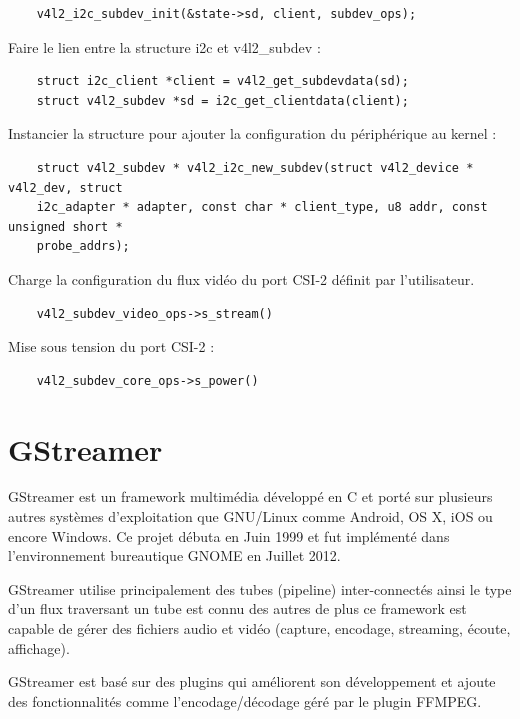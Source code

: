 \begin{lstlisting}
    v4l2_i2c_subdev_init(&state->sd, client, subdev_ops);
\end{lstlisting}

Faire le lien entre la structure i2c et v4l2\_subdev :

\begin{lstlisting}
    struct i2c_client *client = v4l2_get_subdevdata(sd);
    struct v4l2_subdev *sd = i2c_get_clientdata(client);
\end{lstlisting}

Instancier la structure pour ajouter la configuration du périphérique au kernel :

\begin{lstlisting}
    struct v4l2_subdev * v4l2_i2c_new_subdev(struct v4l2_device * v4l2_dev, struct
    i2c_adapter * adapter, const char * client_type, u8 addr, const unsigned short *
    probe_addrs);
\end{lstlisting}

Charge la configuration du flux vidéo du port CSI-2 définit par l’utilisateur.

\begin{lstlisting}
    v4l2_subdev_video_ops->s_stream()
\end{lstlisting}

Mise sous tension du port CSI-2 :

\begin{lstlisting}
    v4l2_subdev_core_ops->s_power()
\end{lstlisting}

\section{GStreamer}

GStreamer est un framework multimédia développé en C et porté sur plusieurs autres
systèmes d’exploitation que GNU/Linux comme Android, OS X, iOS ou encore Windows.
Ce projet débuta en Juin 1999 et fut implémenté dans l’environnement bureautique
GNOME en Juillet 2012. \medskip

GStreamer utilise principalement des tubes (pipeline) inter-connectés ainsi le type d’un
flux traversant un tube est connu des autres de plus ce framework est capable de gérer
des fichiers audio et vidéo (capture, encodage, streaming, écoute, affichage).\medskip

GStreamer est basé sur des plugins qui améliorent son développement et ajoute des
fonctionnalités comme l’encodage/décodage géré par le plugin FFMPEG.\medskip

